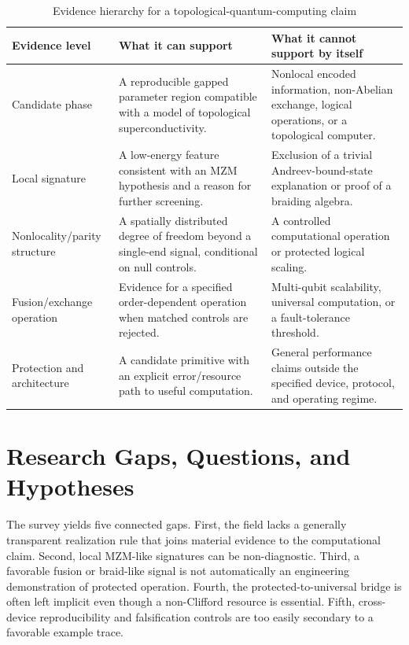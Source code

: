 \documentclass[conference]{IEEEtran}
\begin{document}
\begin{table}[t]
\caption{Evidence hierarchy for a topological-quantum-computing claim}
\label{tab:levels}
\centering
\footnotesize
\begin{tabular}{p{} p{} p{}}
\toprule
\textbf{Evidence level} & \textbf{What it can support} & \textbf{What it cannot support by itself}\\
\midrule
Candidate phase & A reproducible gapped parameter region compatible with a model of topological superconductivity. & Nonlocal encoded information, non-Abelian exchange, logical operations, or a topological computer.\\
Local signature & A low-energy feature consistent with an MZM hypothesis and a reason for further screening. & Exclusion of a trivial Andreev-bound-state explanation or proof of a braiding algebra.\\
Nonlocality/parity structure & A spatially distributed degree of freedom beyond a single-end signal, conditional on null controls. & A controlled computational operation or protected logical scaling.\\
Fusion/exchange operation & Evidence for a specified order-dependent operation when matched controls are rejected. & Multi-qubit scalability, universal computation, or a fault-tolerance threshold.\\
Protection and architecture & A candidate primitive with an explicit error/resource path to useful computation. & General performance claims outside the specified device, protocol, and operating regime.\\
\bottomrule
\end{tabular}
\end{table}

\section{Research Gaps, Questions, and Hypotheses}

The survey yields five connected gaps. First, the field lacks a generally transparent realization rule that joins material evidence to the computational claim. Second, local MZM-like signatures can be non-diagnostic. Third, a favorable fusion or braid-like signal is not automatically an engineering demonstration of protected operation. Fourth, the protected-to-universal bridge is often left implicit even though a non-Clifford resource is essential. Fifth, cross-device reproducibility and falsification controls are too easily secondary to a favorable example trace.
\end{document}
